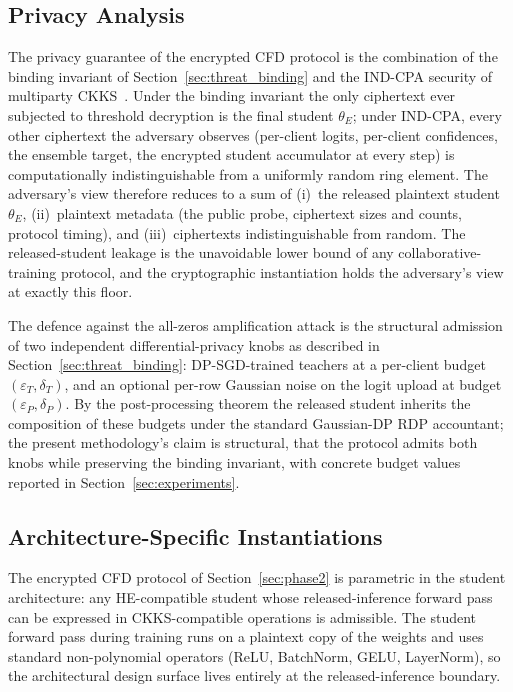 \subsection{Privacy Analysis}
\label{sec:privacy_proof}

The privacy guarantee of the encrypted CFD protocol is the combination of the binding invariant of Section~\ref{sec:threat_binding} and the IND-CPA security of multiparty CKKS~\cite{cheon2017ckks, mouchet2021multiparty}. Under the binding invariant the only ciphertext ever subjected to threshold decryption is the final student $\theta_E$; under IND-CPA, every other ciphertext the adversary observes (per-client logits, per-client confidences, the ensemble target, the encrypted student accumulator at every step) is computationally indistinguishable from a uniformly random ring element. The adversary's view therefore reduces to a sum of (i)~the released plaintext student $\theta_E$, (ii)~plaintext metadata (the public probe, ciphertext sizes and counts, protocol timing), and (iii)~ciphertexts indistinguishable from random. The released-student leakage is the unavoidable lower bound of any collaborative-training protocol, and the cryptographic instantiation holds the adversary's view at exactly this floor.

The defence against the all-zeros amplification attack is the structural admission of two independent differential-privacy knobs as described in Section~\ref{sec:threat_binding}: DP-SGD-trained teachers at a per-client budget $(\varepsilon_T, \delta_T)$, and an optional per-row Gaussian noise on the logit upload at budget $(\varepsilon_P, \delta_P)$. By the post-processing theorem the released student inherits the composition of these budgets under the standard Gaussian-DP RDP accountant; the present methodology's claim is structural, that the protocol admits both knobs while preserving the binding invariant, with concrete budget values reported in Section~\ref{sec:experiments}.


\subsection{Architecture-Specific Instantiations}
\label{sec:architecture}

The encrypted CFD protocol of Section~\ref{sec:phase2} is parametric in the student architecture: any HE-compatible student whose released-inference forward pass can be expressed in CKKS-compatible operations is admissible. The student forward pass during training runs on a plaintext copy of the weights and uses standard non-polynomial operators (ReLU, BatchNorm, GELU, LayerNorm), so the architectural design surface lives entirely at the released-inference boundary.

